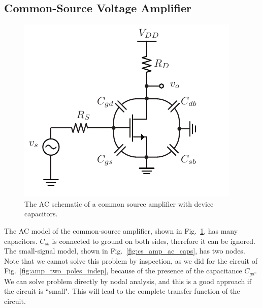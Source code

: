 \subsection{Common-Source Voltage Amplifier}
\begin{figure}[tb]
\begin{center}
\includegraphics[scale=1]{cs_amp_caps}
\end{center}
\caption{The AC schematic of a common source amplifier with device capacitors.} \label{fig:cs_amp_caps}
\end{figure}

The AC model of the common-source amplifier, shown in Fig.~\ref{fig:cs_amp_caps}, has many capacitors.  
 $C_{sb}$ is connected to ground on both sides, therefore it can be ignored.  The small-signal model, shown in Fig.~\ref{fig:cs_amp_ac_caps}, has two nodes.  Note that we cannot solve this problem by inspection, as we did for the circuit of Fig.~\ref{fig:amp_two_poles_indep}, because of the presence of the capacitance $C_{gd}$. We can solve problem directly by nodal analysis, and this is a good approach if the circuit is ``small".  This will lead to the complete transfer function of the circuit.

